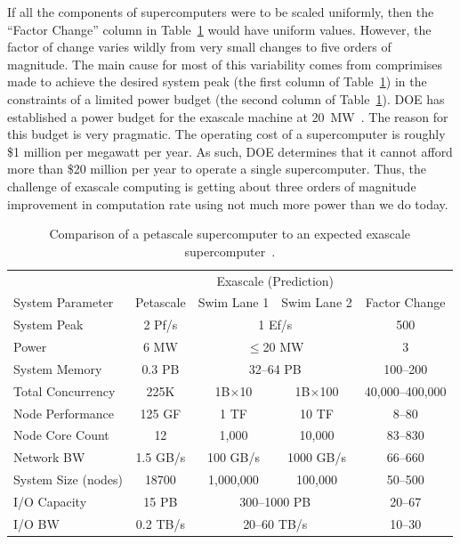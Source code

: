 \documentclass[conference]{IEEEtran}
\newcommand*{\lcite}[1]{~\cite{#1}}
\begin{document}
If all the components of supercomputers were to be scaled uniformly, then
the ``Factor Change'' column in Table~\ref{table:PetascaleVsExascale} would
have uniform values.  However, the factor of change varies wildly from very
small changes to five orders of magnitude.  The main cause for most of this
variability comes from comprimises made to achieve the desired system peak
(the first column of Table~\ref{table:PetascaleVsExascale}) in the
constraints of a limited power budget (the second column of
Table~\ref{table:PetascaleVsExascale}).  DOE has established a power budget
for the exascale machine at 20~MW\lcite{ExascaleArchitecturesReport}.  The
reason for this budget is very pragmatic.  The operating cost of a
supercomputer is roughly \$1 million per megawatt per year.  As such, DOE
determines that it cannot afford more than \$20 million per year to operate
a single supercomputer.  Thus, the challenge of exascale computing is
getting about three orders of magnitude improvement in computation rate
using not much more power than we do today.

\begin{table}[htdp]
  \centering
  \caption{Comparison of a petascale supercomputer to an expected exascale
    supercomputer\lcite{ScientificDiscoveryExascale2011}.}
  \label{table:PetascaleVsExascale}
  \begin{tabular}{@{}lcccc@{}}
    \toprule
    & & \multicolumn{2}{c}{Exascale (Prediction)} & \\
    System Parameter & Petascale & Swim Lane 1 & Swim Lane 2 & Factor Change \\
    \midrule
    System Peak & 2 Pf/s & \multicolumn{2}{c}{1 Ef/s} & 500 \\
    Power & 6 MW & \multicolumn{2}{c}{$\le$20 MW} & 3\\
    System Memory & 0.3 PB & \multicolumn{2}{c}{32--64 PB} & 100--200 \\ %
    Total Concurrency & 225K & 1B$\times$10 & 1B$\times$100 & 40,000--400,000 \\
    Node Performance & 125 GF & 1 TF & 10 TF & 8--80\\
    Node Core Count & 12 & 1,000 & 10,000 & 83--830 \\
    Network BW & 1.5 GB/s & 100 GB/s & 1000 GB/s & 66--660 \\
    System Size (nodes) & 18700 & 1,000,000 & 100,000 & 50--500 \\
    I/O Capacity & 15 PB & \multicolumn{2}{c}{300--1000 PB} & 20--67\\
    I/O BW & 0.2 TB/s & \multicolumn{2}{c}{20--60 TB/s} & 10--30 \\
    \bottomrule
  \end{tabular}
\end{table}
\end{document}
